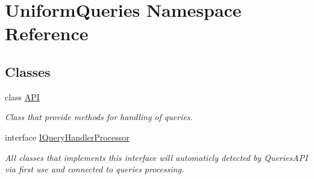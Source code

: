 \hypertarget{namespace_uniform_queries}{}\section{Uniform\+Queries Namespace Reference}
\label{namespace_uniform_queries}
\subsection*{Classes}
\begin{DoxyCompactItemize}
\item 
class \mbox{\hyperlink{class_uniform_queries_1_1_a_p_i}{A\+PI}}
\begin{DoxyCompactList}\small\item\em Class that provide methods for handling of queries. \end{DoxyCompactList}\item 
interface \mbox{\hyperlink{interface_uniform_queries_1_1_i_query_handler_processor}{I\+Query\+Handler\+Processor}}
\begin{DoxyCompactList}\small\item\em All classes that implements this interface will automaticly detected by Queries\+A\+PI via first use and connected to queries processing. \end{DoxyCompactList}\end{DoxyCompactItemize}
